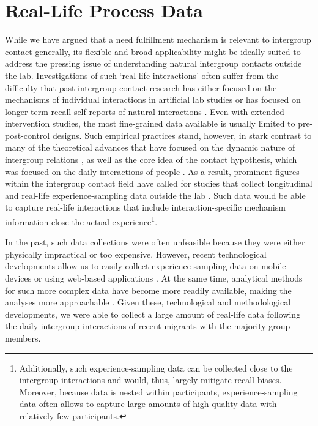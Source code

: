 \documentclass[man, 12pt, a4paper, mask]{apa7}
\theoremstyle{break}
\theoremstyle{plain}
\begin{document}
\section{Real-Life Process Data}
While we have argued that a need fulfillment mechanism is relevant to intergroup contact generally, its flexible and broad applicability might be ideally suited to address the pressing issue of understanding natural intergroup contacts outside the lab. Investigations of such `real-life interactions' often suffer from the difficulty that past intergroup contact research has either focused on the mechanisms of individual interactions in artificial lab studies or has focused on longer-term recall self-reports of natural interactions \citep[e.g.,][]{Pettigrew2006}. Even with extended intervention studies, the most fine-grained data available is usually limited to pre-post-control designs. Such empirical practices stand, however, in stark contrast to many of the theoretical advances that have focused on the dynamic nature of intergroup relations \citep[e.g.,][]{Pettigrew1998}, as well as the core idea of the contact hypothesis, which was focused on the daily interactions of people \citep[see][]{Allport1954b}. As a result, prominent figures within the intergroup contact field have called for studies that collect longitudinal \citep[][]{Pettigrew1998, Pettigrew2008, Pettigrew2008b, Pettigrew2011} and real-life experience-sampling data outside the lab \citep[][]{MacInnis2015, McKeown2017, Dixon2005}. Such data would be able to capture real-life interactions that include interaction-specific mechanism information close the actual experience\footnote{Additionally, such experience-sampling data can be collected close to the intergroup interactions and would, thus, largely mitigate recall biases. Moreover, because data is nested within participants, experience-sampling data often allows to capture large amounts of high-quality data with relatively few participants.}.

In the past, such data collections were often unfeasible because they were either physically impractical or too expensive. However, recent technological developments allow us to easily collect experience sampling data on mobile devices \citep[e.g.,][]{Keil2020} or using web-based applications \citep[e.g.,][]{Arslan2020}. At the same time, analytical methods for such more complex data have become more readily available, making the analyses more approachable \citep[e.g., see][]{ODonnell2021}. Given these, technological and methodological developments, we were able to collect a large amount of real-life data following the daily intergroup interactions of recent migrants with the majority group members.  
\end{document}
